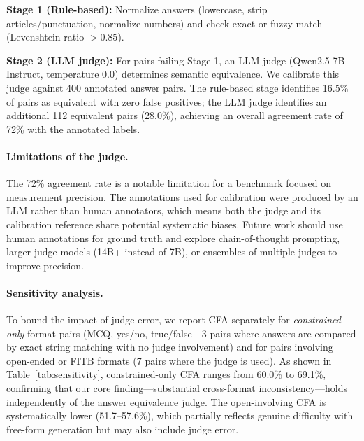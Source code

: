 \documentclass{article}
\begin{document}
\textbf{Stage 1 (Rule-based):} Normalize answers (lowercase, strip articles/punctuation, normalize numbers) and check exact or fuzzy match (Levenshtein ratio $> 0.85$).

\textbf{Stage 2 (LLM judge):} For pairs failing Stage 1, an LLM judge (Qwen2.5-7B-Instruct, temperature 0.0) determines semantic equivalence. We calibrate this judge against 400 annotated answer pairs. The rule-based stage identifies 16.5\% of pairs as equivalent with zero false positives; the LLM judge identifies an additional 112 equivalent pairs (28.0\%), achieving an overall agreement rate of 72\% with the annotated labels.

\paragraph{Limitations of the judge.} The 72\% agreement rate is a notable limitation for a benchmark focused on measurement precision. The annotations used for calibration were produced by an LLM rather than human annotators, which means both the judge and its calibration reference share potential systematic biases. Future work should use human annotations for ground truth and explore chain-of-thought prompting, larger judge models (14B+ instead of 7B), or ensembles of multiple judges to improve precision.

\paragraph{Sensitivity analysis.} To bound the impact of judge error, we report CFA separately for \emph{constrained-only} format pairs (MCQ, yes/no, true/false---3 pairs where answers are compared by exact string matching with no judge involvement) and for pairs involving open-ended or FITB formats (7 pairs where the judge is used). As shown in Table~\ref{tab:sensitivity}, constrained-only CFA ranges from 60.0\% to 69.1\%, confirming that our core finding---substantial cross-format inconsistency---holds independently of the answer equivalence judge. The open-involving CFA is systematically lower (51.7--57.6\%), which partially reflects genuine difficulty with free-form generation but may also include judge error.
\end{document}
